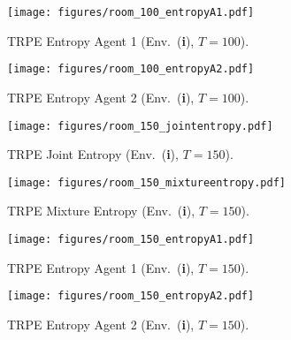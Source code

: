 \begin{figure*}[]
    \hfill
    \begin{subfigure}[b]{0.245\textwidth}
        \centering
        \texttt{[image: figures/room\_100\_entropyA1.pdf]}
        \caption{\centering TRPE Entropy Agent 1 (Env.~(\textbf{i}), $T=100$).}
        \label{subfig:image11}
    \end{subfigure}
    \hfill
    \begin{subfigure}[b]{0.245\textwidth}
        \centering
        \texttt{[image: figures/room\_100\_entropyA2.pdf]}
        \caption{\centering TRPE Entropy Agent 2 (Env.~(\textbf{i}), $T=100$).}
        \label{subfig:image11}
    \end{subfigure}
    \vfill 
    \begin{subfigure}[b]{0.245\textwidth}
        \texttt{[image: figures/room\_150\_jointentropy.pdf]}
        \caption{\centering TRPE Joint Entropy (Env.~(\textbf{i}), $T=150$).}
        \label{subfig:imagea1}
    \end{subfigure}
    \hfill
    \begin{subfigure}[b]{0.245\textwidth}
        \texttt{[image: figures/room\_150\_mixtureentropy.pdf]}
        \caption{\centering TRPE Mixture Entropy (Env.~(\textbf{i}), $T=150$).}
        \label{subfig:imagea2}
    \end{subfigure}
    \hfill
    \begin{subfigure}[b]{0.245\textwidth}
        \centering
        \texttt{[image: figures/room\_150\_entropyA1.pdf]}
        \caption{\centering TRPE Entropy Agent 1 (Env.~(\textbf{i}), $T=150$).}
        \label{subfig:image11}
    \end{subfigure}
    \hfill
    \begin{subfigure}[b]{0.245\textwidth}
        \centering
        \texttt{[image: figures/room\_150\_entropyA2.pdf]}
        \caption{\centering TRPE Entropy Agent 2 (Env.~(\textbf{i}), $T=150$).}
        \label{subfig:image11}
    \end{subfigure}
    \vfill
    \begin{subfigure}[b]{0.245\textwidth}

\end{subfigure}
\end{figure*}
